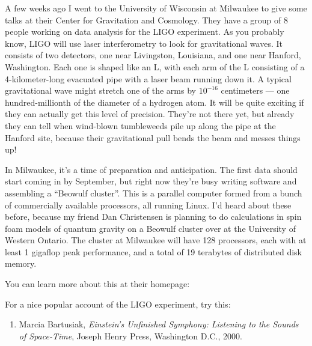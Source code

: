 \documentclass{article}
\def\tightlist{}
\renewcommand{\texttt}[1]{%
  \begingroup
  \ttfamily
  \begingroup\lccode`~=`/\lowercase{\endgroup\def~}{/\discretionary{}{}{}}%
  \begingroup\lccode`~=`[\lowercase{\endgroup\def~}{[\discretionary{}{}{}}%
  \begingroup\lccode`~=`.\lowercase{\endgroup\def~}{.\discretionary{}{}{}}%
  \catcode`/=\active\catcode`[=\active\catcode`.=\active
  \scantokens{#1\noexpand}%
  \endgroup
}
\begin{document}
A few weeks ago I went to the University of Wisconsin at Milwaukee to
give some talks at their Center for Gravitation and Cosmology. They have
a group of 8 people working on data analysis for the LIGO experiment. As
you probably know, LIGO will use laser interferometry to look for
gravitational waves. It consists of two detectors, one near Livingston,
Louisiana, and one near Hanford, Washington. Each one is shaped like an
L, with each arm of the L consisting of a 4-kilometer-long evacuated
pipe with a laser beam running down it. A typical gravitational wave
might stretch one of the arms by \(10^{-16}\) centimeters --- one
hundred-millionth of the diameter of a hydrogen atom. It will be quite
exciting if they can actually get this level of precision. They're not
there yet, but already they can tell when wind-blown tumbleweeds pile up
along the pipe at the Hanford site, because their gravitational pull
bends the beam and messes things up!

In Milwaukee, it's a time of preparation and anticipation. The first
data should start coming in by September, but right now they're busy
writing software and assembling a ``Beowulf cluster''. This is a
parallel computer formed from a bunch of commercially available
processors, all running Linux. I'd heard about these before, because my
friend Dan Christensen is planning to do calculations in spin foam
models of quantum gravity on a Beowulf cluster over at the University of
Western Ontario. The cluster at Milwaukee will have 128 processors, each
with at least 1 gigaflop peak performance, and a total of 19 terabytes
of distributed disk memory.

You can learn more about this at their homepage:


For a nice popular account of the LIGO experiment, try this:

\begin{enumerate}
\def\labelenumi{\arabic{enumi})}
\setcounter{enumi}{1}
\tightlist
\item
  Marcia Bartusiak, \emph{Einstein's Unfinished Symphony: Listening to
  the Sounds of Space-Time}, Joseph Henry Press, Washington D.C., 2000.
\end{enumerate}
\end{document}
